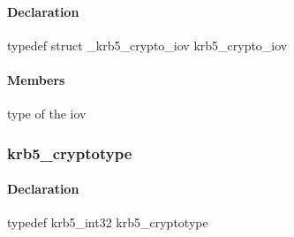\documentclass[letterpaper,10pt,english]{sphinxmanual}
\begin{document}
\paragraph{Declaration}
\label{appdev/refs/types/krb5_crypto_iov:declaration}
typedef struct \_krb5\_crypto\_iov  krb5\_crypto\_iov


\paragraph{Members}
\label{appdev/refs/types/krb5_crypto_iov:members}

\begin{fulllineitems}
\label{appdev/refs/types/krb5_crypto_iov:c.krb5_crypto_iov.flags}
 type of the iov

\end{fulllineitems}


\begin{fulllineitems}
\label{appdev/refs/types/krb5_crypto_iov:c.krb5_crypto_iov.data}
\end{fulllineitems}



\subsubsection{krb5\_cryptotype}
\label{appdev/refs/types/krb5_cryptotype:krb5-cryptotype}\label{appdev/refs/types/krb5_cryptotype::doc}\label{appdev/refs/types/krb5_cryptotype:krb5-cryptotype-struct}

\begin{fulllineitems}
\label{appdev/refs/types/krb5_cryptotype:c.krb5_cryptotype}
\end{fulllineitems}



\paragraph{Declaration}
\label{appdev/refs/types/krb5_cryptotype:declaration}
typedef krb5\_int32 krb5\_cryptotype
\end{document}
